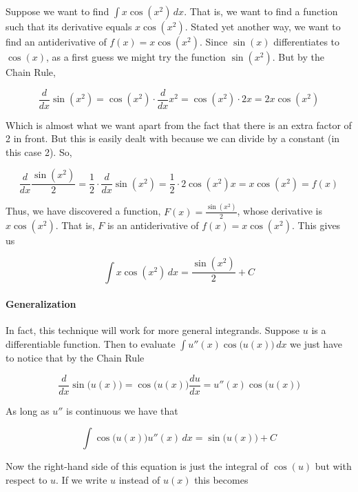Suppose we want to find $\int x \cos(x^2) \, dx$. That is, we want to find a function such that its derivative equals $x \cos(x^2)$. Stated yet another way, we want to find an antiderivative of $f(x) = x \cos(x^2)$. Since $\sin(x)$ differentiates to $\cos(x)$, as a first guess we might try the function $\sin(x^2)$. But by the Chain Rule,



$$\frac{d}{dx} \sin(x^2) = \cos(x^2) \cdot \frac{d}{dx} x^2 = \cos(x^2) \cdot 2x = 2x \cos(x^2)$$



Which is almost what we want apart from the fact that there is an extra factor of 2 in front. But this is easily dealt with because we can divide by a constant (in this case 2). So,



$$\frac{d}{dx} \frac{\sin(x^2)}{2} = \frac{1}{2} \cdot \frac{d}{dx} \sin(x^2) = \frac{1}{2} \cdot 2\cos(x^2) x = x \cos(x^2) = f(x)$$



Thus, we have discovered a function, $F(x) = \frac{\sin(x^2)}{2}$, whose derivative is $x \cos(x^2)$. That is, $F$ is an antiderivative of $f(x) = x \cos(x^2)$. This gives us



$$\int x \cos(x^2) \, dx = \frac{\sin(x^2)}{2} + C$$



\paragraph{Generalization}



In fact, this technique will work for more general integrands. Suppose $u$ is a differentiable function. Then to evaluate $\int u''(x) \cos\bigl(u(x)\bigr) \, dx$ we just have to notice that by the Chain Rule



$$\frac{d}{dx} \sin\bigl(u(x)\bigr) = \cos\bigl(u(x)\bigr) \frac{du}{dx} = u''(x) \cos\bigl(u(x)\bigr)$$



As long as $u''$ is continuous we have that



$$\int \cos\bigl(u(x)\bigr) u''(x) \, dx = \sin\bigl(u(x)\bigr) + C$$



Now the right-hand side of this equation is just the integral of $\cos(u)$ but with respect to $u$. If we write $u$ instead of $u(x)$ this becomes



